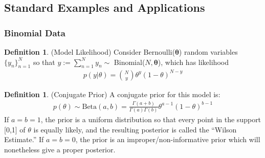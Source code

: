 \documentclass[12pt]{article}
\theoremstyle{plain}
\theoremstyle{definition}
\newtheorem{defn}[thm]{Definition}
\theoremstyle{remark}
\newcommand{\bstheta}{\boldsymbol{\theta}}
\newcommand{\sumnN}{\sum^N_{n=1}}
\newcommand{\nN}{_{n=1}^N}
\begin{document}


\clearpage
\subsection{Standard Examples and Applications}

\subsubsection{Binomial Data}


\begin{defn}(Model Likelihood)
Consider Bernoulli($\bstheta$) random variables $\{y_n\}\nN$ so that
$y:=\sumnN y_n\sim$ Binomial($N,\bstheta$), which has likelihood
\begin{align*}
   p(y|\theta) = \binom{N}{y} \theta^y (1-\theta)^{N-y}
\end{align*}
\end{defn}

\begin{defn}(Conjugate Prior)
A conjugate prior for this model is:
\begin{align*}
  p(\theta)
  \sim
  \text{Beta}(a,b)
  =
  \frac{\Gamma(a + b)}{\Gamma(a)\Gamma(b)}
  \theta^{a-1}(1-\theta)^{b-1}
\end{align*}
If $a=b=1$, the prior is a uniform distribution so that every point in
the support [0,1] of $\theta$ is equally likely, and the resulting
posterior is called the ``Wilson Estimate.''
If $a=b=0$, the prior is an improper/non-informative prior which will
nonetheless give a proper posterior.
\end{defn}
\end{document}
